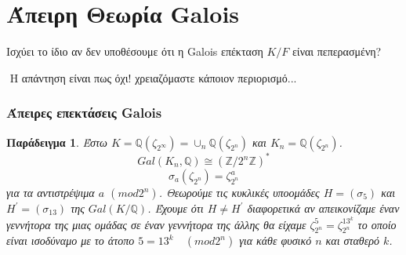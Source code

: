 \documentclass{beamer}
\newcommand {\tl}{\textlatin}
\newtheorem{exa}{Παράδειγμα}
\begin{document}
\section{Άπειρη Θεωρία \tl{Galois}}


\begin{frame}
    Ισχύει το ίδιο αν δεν υποθέσουμε ότι η \tl{Galois} επέκταση $K/F$ είναι πεπερασμένη?
    \pause
    
    
    $ $\newline
    Η απάντηση είναι πως όχι! χρειαζόμαστε κάποιον περιορισμό... %
\end{frame}

\begin{frame}
    \frametitle{Άπειρες επεκτάσεις \tl{Galois}}
    \begin{exa}
    Έστω $K = \mathbb{Q}(\zeta_{2^{\infty}}) = \cup_n \mathbb{Q} (\zeta_{2^n})$ και $K_n = \mathbb{Q}(\zeta_{2^n})$.
    $$Gal(K_n,\mathbb{Q} ) \cong (\mathbb{Z} / 2^n \mathbb{Z} )^*$$
	$$\sigma_a (\zeta_{2^n}) = \zeta^a_{2^n}$$
	για τα αντιστρέψιμα $a$  $(mod2^n)$. Θεωρούμε τις κυκλικές υποομάδες $H = (\sigma_5)$ και $H^{\prime} = (\sigma_{13})$ της $Gal(K/ \mathbb Q)$. Έχουμε ότι $H \neq H^{\prime}$ διαφορετικά αν απεικονίζαμε έναν γεννήτορα της μιας ομάδας σε έναν γεννήτορα της άλλης θα είχαμε $\zeta^5_{2^n} = \zeta^{13^k}_{2^n}$ το οποίο είναι ισοδύναμο με το άτοπο $5 = 13^k \quad (mod2^n)$ για κάθε φυσικό $n$ και σταθερό $k$.
    \end{exa}
\end{frame}
\end{document}
